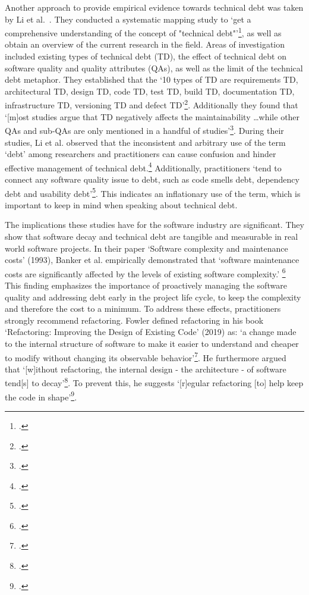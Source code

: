 Another approach to provide empirical evidence towards technical debt was taken by Li et al.\ . They conducted a systematic mapping study to `get a comprehensive understanding of the concept of "technical debt"'\footcite[194]{liSystematicMappingStudy2015}, as well as obtain an overview of the current research in the field.
Areas of investigation included existing types of technical debt (TD), the effect of technical debt on software quality and quality attributes (QAs), as well as the limit of the technical debt metaphor.
They established that the `10 types of TD are requirements TD, architectural TD, design TD, code TD, test TD, build TD, documentation TD, infrastructure TD, versioning TD and defect TD'\footcite[215]{liSystematicMappingStudy2015}.
Additionally they found that `[m]ost studies argue that TD negatively affects the maintainability \ldots while other QAs and sub-QAs are only mentioned in a handful of studies'\footcite[215]{liSystematicMappingStudy2015}.
During their studies,  Li et al. observed that the inconsistent and arbitrary use of the term `debt' among researchers and practitioners can cause confusion and hinder effective management of technical debt.\footcite[211]{liSystematicMappingStudy2015} Additionally, practitioners `tend to connect any software quality issue to debt, such as code smells debt, dependency debt and usability debt'\footcite[212]{liSystematicMappingStudy2015}.
This indicates an inflationary use of the term, which is important to keep in mind when speaking about technical debt.

The implications these studies have for the software industry are significant. They show that software decay and technical debt are tangible and measurable in real world software projects.
In their paper `Software complexity and maintenance costs' (1993), Banker et al. empirically demonstrated that `software maintenance costs are significantly affected by the levels of existing software complexity.' \footcite[12]{bankerSoftwareComplexityMaintenance1993}
This finding emphasizes the importance of proactively managing the software quality and addressing debt early in the project life cycle, to keep the complexity and therefore the cost to a minimum.
To address these effects, practitioners strongly recommend refactoring. Fowler defined refactoring in his book `Refactoring: Improving the Design of Existing Code' (2019) as: `a change made to the internal structure of software to make it  easier to understand and cheaper to modify without changing its observable behavior'\footcite[56]{fowlerRefactoringImprovingDesign2019}.
He furthermore argued that `[w]ithout refactoring, the internal design - the architecture - of software tend[s] to decay'\footcite[58]{fowlerRefactoringImprovingDesign2019}.
To prevent this, he suggests `[r]egular refactoring [to] help keep the code in shape'\footcite[58]{fowlerRefactoringImprovingDesign2019}.

